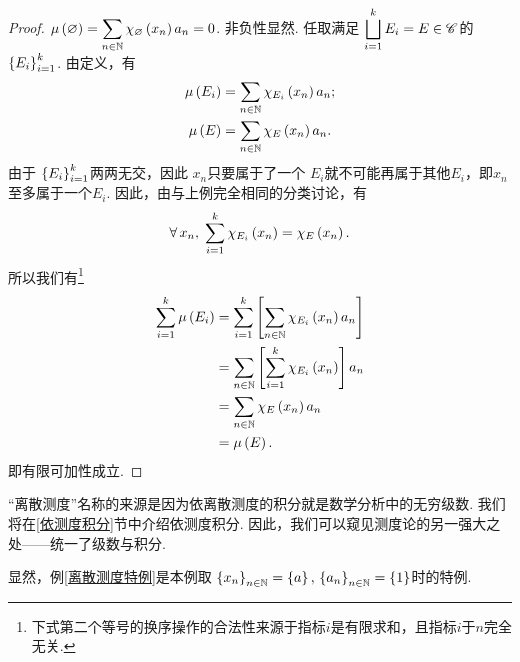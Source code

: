 \begin{proof}
    $\mu\left(\varnothing\right)=\displaystyle \sum_{n\in\mathbb{N}} \chi_\varnothing\left(x_n\right) a_n=0$. 非负性显然. 任取满足 $\displaystyle \bigsqcup_{i=1}^k E_i =E\in\mathscr{C}$的 $\left\{ E_i \right\}_{i=1}^k$. 由定义，有
    \begin{align*}
        \mu\left(E_i\right) &= \sum_{n\in\mathbb{N}}\chi_{E_i} \left(x_n\right) a_n ; \\
        \mu\left(E\right) &= \sum_{n\in\mathbb{N}}\chi_E \left(x_n\right) a_n.
    \end{align*}
    由于 $\left\{ E_i \right\}_{i=1}^k$两两无交，因此 $x_n$只要属于了一个 $E_i$就不可能再属于其他$E_i$，即$x_n$至多属于一个$E_i$. 因此，由与上例完全相同的分类讨论，有
    \[  \forall\,x_n,\; \sum_{i=1}^k \chi_{E_i}\left(x_n\right) = \chi_E\left(x_n\right).  \]
    所以我们有\footnote{下式第二个等号的换序操作的合法性来源于指标$i$是有限求和，且指标$i$于$n$完全无关.}
    \begin{align*}
        \sum_{i=1}^k \mu\left(E_i\right) &= \sum_{i=1}^k \left[    \sum_{n\in\mathbb{N}} \chi_{E_i} \left(x_n\right) a_n   \right] \\
        &= \sum_{n\in\mathbb{N}} \left[  \sum_{i=1}^k \chi_{E_i} \left(x_n\right)  \right]  a_n \\
        &= \sum_{n\in\mathbb{N}} \chi_E \left(x_n\right) a_n \\
        &= \mu\left(E\right).
    \end{align*}
    即有限可加性成立.
\end{proof}
\begin{remark}
    “离散测度”名称的来源是因为依离散测度的积分就是数学分析中的无穷级数. 我们将在\ref{依测度积分}节中介绍依测度积分. 因此，我们可以窥见测度论的另一强大之处——统一了级数与积分.
\end{remark}
\begin{remark}
    显然，例\ref{离散测度特例}是本例取 $\left\{x_n\right\}_{n\in\mathbb{N}}=\left\{a\right\},\,\left\{a_n\right\}_{n\in\mathbb{N}}=\left\{1\right\}$时的特例.
\end{remark}
\vspace{0.5cm}

